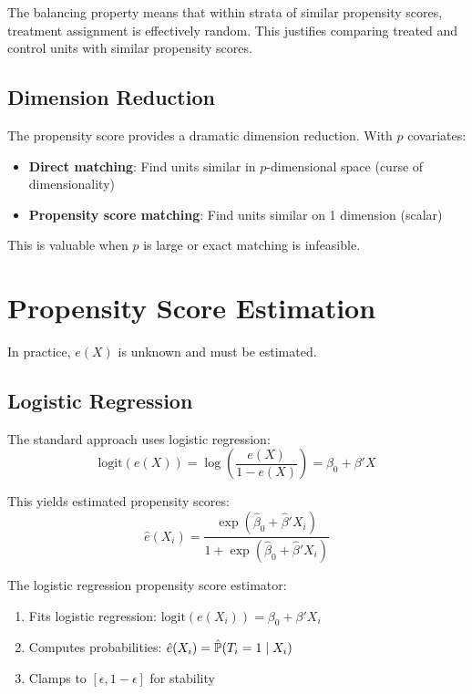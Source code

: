 \begin{insight}
The balancing property means that within strata of similar propensity scores, treatment assignment is effectively random. This justifies comparing treated and control units with similar propensity scores.
\end{insight}

\subsection{Dimension Reduction}

The propensity score provides a dramatic dimension reduction. With $p$ covariates:
\begin{itemize}
    \item \textbf{Direct matching}: Find units similar in $p$-dimensional space (curse of dimensionality)
    \item \textbf{Propensity score matching}: Find units similar on 1 dimension (scalar)
\end{itemize}

This is valuable when $p$ is large or exact matching is infeasible.


\section{Propensity Score Estimation}
\label{sec:psm_estimation}

In practice, $e(X)$ is unknown and must be estimated.

\subsection{Logistic Regression}

The standard approach uses logistic regression:
\begin{equation}
\text{logit}(e(X)) = \log\left(\frac{e(X)}{1 - e(X)}\right) = \beta_0 + \beta' X
\label{eq:logit_ps}
\end{equation}

This yields estimated propensity scores:
\begin{equation}
\hat{e}(X_i) = \frac{\exp(\hat{\beta}_0 + \hat{\beta}' X_i)}{1 + \exp(\hat{\beta}_0 + \hat{\beta}' X_i)}
\label{eq:ps_estimate}
\end{equation}

\begin{definition}
\label{def:ps_estimator}
The logistic regression propensity score estimator:
\begin{enumerate}
    \item Fits logistic regression: $\text{logit}(e(X_i)) = \beta_0 + \beta' X_i$
    \item Computes probabilities: $\hat{e}(X_i) = \hat{\mathbb{P}}(T_i = 1 \mid X_i)$
    \item Clamps to $[\epsilon, 1-\epsilon]$ for stability
\end{enumerate}
\end{definition}

